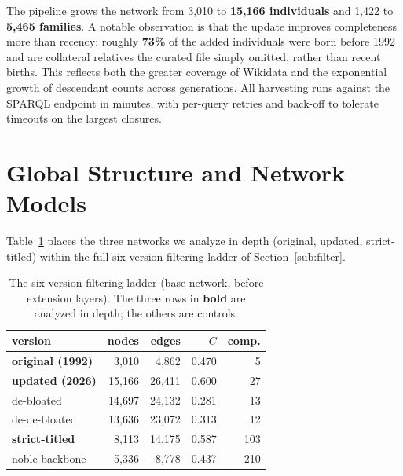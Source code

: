 The pipeline grows the network from 3{,}010 to \textbf{15{,}166 individuals} and
1{,}422 to \textbf{5{,}465 families}. A notable observation is that the update
improves completeness more than recency: roughly \textbf{73\%} of the
added individuals were born before 1992 and are collateral relatives the
curated file simply omitted, rather than recent births. This reflects both the
greater coverage of Wikidata and the exponential growth of descendant counts across
generations. All harvesting runs against the SPARQL endpoint in minutes,
with per-query retries and back-off to tolerate timeouts on the largest closures.

\section{Global Structure and Network Models}
\label{sec:structure}

Table~\ref{tab:ladder} places the three networks we analyze in depth (original,
updated, strict-titled) within the full six-version filtering ladder of
Section~\ref{sub:filter}.

\begin{table}[H]
\caption{The six-version filtering ladder (base network, before extension layers).
The three rows in \textbf{bold} are analyzed in depth; the others are controls.}
\label{tab:ladder}
\centering\small
\begin{tabular}{lrrrr}
\toprule
version & nodes & edges & $C$ & comp. \\
\midrule
\textbf{original (1992)}   & 3{,}010  & 4{,}862  & 0.470 & 5 \\
\textbf{updated (2026)}    & 15{,}166 & 26{,}411 & 0.600 & 27 \\
de-bloated                 & 14{,}697 & 24{,}132 & 0.281 & 13 \\
de-de-bloated              & 13{,}636 & 23{,}072 & 0.313 & 12 \\
\textbf{strict-titled}     & 8{,}113  & 14{,}175 & 0.587 & 103 \\
noble-backbone             & 5{,}336  & 8{,}778  & 0.437 & 210 \\
\bottomrule
\end{tabular}
\end{table}

